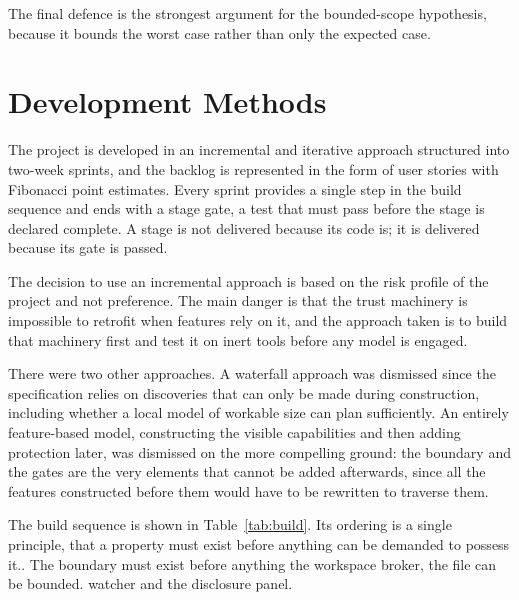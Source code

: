 \documentclass{FastFyp}
\begin{document}
The final defence is the strongest argument for the bounded-scope hypothesis, because it bounds the worst case rather than only the expected case.

\section{Development Methods}
The project is developed in an incremental and iterative approach structured into two-week sprints, and the backlog is represented in the form of user stories with Fibonacci point estimates. Every sprint provides a single step in the build sequence and ends with a stage gate, a test that must pass before the stage is declared complete. A stage is not delivered because its code is; it is delivered because its gate is passed.

The decision to use an incremental approach is based on the risk profile of the project and not preference. The main danger is that the trust machinery is impossible to retrofit when features rely on it, and the approach taken is to build that machinery first and test it on inert tools before any model is engaged.

There were two other approaches. A waterfall approach was dismissed since the specification relies on discoveries that can only be made during construction, including whether a local model of workable size can plan sufficiently. An entirely feature-based model, constructing the visible capabilities and then adding protection later, was dismissed on the more compelling ground: the boundary and the gates are the very elements that cannot be added afterwards, since all the features constructed before them would have to be rewritten to traverse them.

The build sequence is shown in Table~\ref{tab:build}. Its ordering is a single principle, that a property must exist before anything can be demanded to possess it.. The boundary must exist before anything the workspace broker, the file can be bounded. watcher and the disclosure panel.
\end{document}
